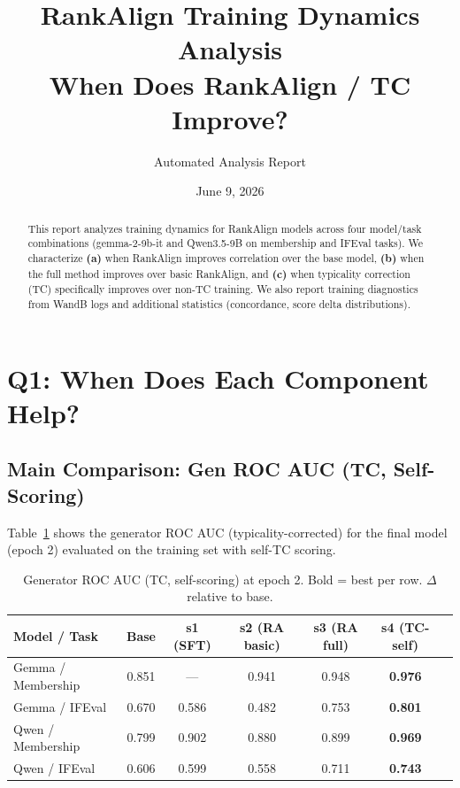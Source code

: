 \documentclass[11pt,a4paper]{article}
\title{RankAlign Training Dynamics Analysis\\
\large When Does RankAlign / TC Improve?}
\author{Automated Analysis Report}
\date{June 9, 2026}
\begin{document}
\maketitle

\begin{abstract}
This report analyzes training dynamics for RankAlign models across four model/task combinations (gemma-2-9b-it and Qwen3.5-9B on membership and IFEval tasks). We characterize \textbf{(a)} when RankAlign improves correlation over the base model, \textbf{(b)} when the full method improves over basic RankAlign, and \textbf{(c)} when typicality correction (TC) specifically improves over non-TC training. We also report training diagnostics from WandB logs and additional statistics (concordance, score delta distributions).
\end{abstract}

\tableofcontents
\newpage

\section{Q1: When Does Each Component Help?}

\subsection{Main Comparison: Gen ROC AUC (TC, Self-Scoring)}

Table~\ref{tab:main_comparison} shows the generator ROC AUC (typicality-corrected) for the final model (epoch 2) evaluated on the training set with self-TC scoring.

\begin{table}[H]
\centering
\caption{Generator ROC AUC (TC, self-scoring) at epoch 2. Bold = best per row. $\Delta$ relative to base.}
\label{tab:main_comparison}
\begin{tabular}{lcccccc}
\toprule
\textbf{Model / Task} & \textbf{Base} & \textbf{s1 (SFT)} & \textbf{s2 (RA basic)} & \textbf{s3 (RA full)} & \textbf{s4 (TC-self)} \\
\midrule
Gemma / Membership & 0.851 & --- & 0.941 & 0.948 & \textbf{0.976} \\
Gemma / IFEval    & 0.670 & 0.586 & 0.482 & 0.753 & \textbf{0.801} \\
Qwen / Membership  & 0.799 & 0.902 & 0.880 & 0.899 & \textbf{0.969} \\
Qwen / IFEval     & 0.606 & 0.599 & 0.558 & 0.711 & \textbf{0.743} \\
\bottomrule
\end{tabular}
\end{table}
\end{document}
